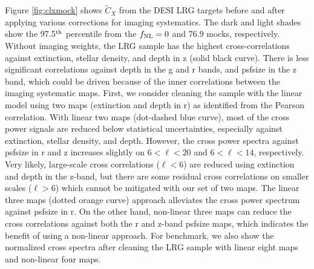 Figure \ref{fig:clxmock} shows $\tilde{C}_{X}$ from the DESI LRG targets before and after applying various corrections for imaging systematics. The dark and light shades show the 97.5$^{\rm th}$ percentile from the $f_{\rm NL}=0$ and $76.9$ mocks, respectively. Without imaging weights, the LRG sample has the highest cross-correlations against extinction, stellar density, and depth in z (solid black curve). There is less significant correlations against depth in the g and r bands, and psfsize in the z band, which could be driven because of the inner correlations between the imaging systematic maps. First, we consider cleaning the sample with the linear model using two maps (extinction and depth in r) as identified from the Pearson correlation. With linear two maps (dot-dashed blue curve), most of the cross power signals are reduced below statistical uncertainties, especially against extinction, stellar density, and depth. However, the cross power spectra against psfsize in r and z increases slightly on $6<\ell<20$ and $6<\ell<14$, respectively. Very likely, large-scale cross correlations ($\ell < 6$) are reduced using extinction and depth in the z-band, but there are some residual cross correlations on smaller scales ($\ell > 6$) which cannot be mitigated with our set of two maps. The linear three maps (dotted orange curve) approach alleviates the cross power spectrum against psfsize in r. On the other hand, non-linear three maps can reduce the cross correlations against both the r and z-band psfsize maps, which indicates the benefit of using a non-linear approach. For benchmark, we also show the normalized cross spectra after cleaning the LRG sample with linear eight maps and non-linear four maps. 

